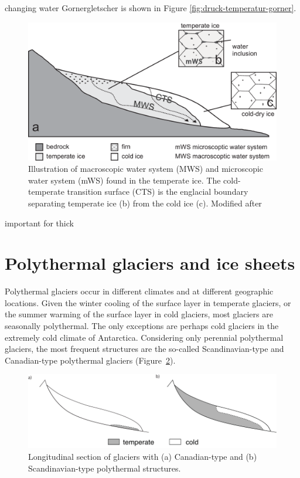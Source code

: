 \documentclass[parskip=half]{scrartcl}
\begin{document}
changing water %
Gornergletscher is shown in Figure %
\ref{fig:druck-temperatur-gorner}.


 \begin{figure}[tbhp] \centering
  \includegraphics[width=12.cm]{figures/mws}
  \caption{Illustration of macroscopic water system (MWS) and
microscopic water system (mWS) found in the temperate ice. The
cold-temperate transition surface (CTS) is the englacial boundary
separating temperate ice (b) from the cold ice (c). Modified after
\cite{Gusmeroli2010}}
  \label{fig:mws}
\end{figure}

important for thick %


\section{Polythermal glaciers and ice sheets}
\label{sec:polythermal-glaciers}

Polythermal glaciers occur in different climates and at different
geographic locations. Given the winter cooling of the surface layer in
temperate glaciers, or the summer warming of the surface layer in cold
glaciers, most glaciers are seasonally polythermal. The only
exceptions are perhaps cold glaciers in the extremely cold climate of
Antarctica. Considering only perennial polythermal glaciers, the most
frequent structures are the so-called Scandinavian-type and
Canadian-type polythermal glaciers
(Figure~\ref{fig:thermal-structures}).

\begin{figure}
  \begin{centering}
  \includegraphics[width=\textwidth]{figures/CTSstructures-2land}
  \caption{Longitudinal section of glaciers with (a) Canadian-type and
(b) Scandinavian-type polythermal structures.}
  \label{fig:thermal-structures}
  \end{centering}
\end{figure}
\end{document}
